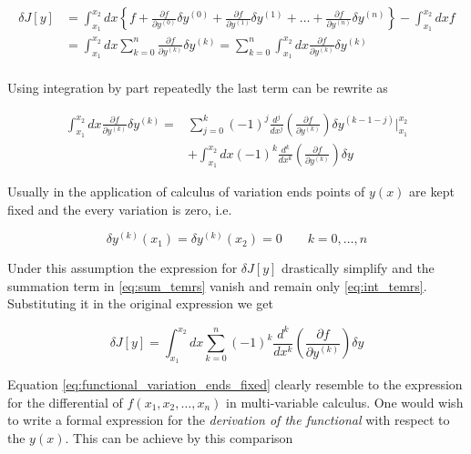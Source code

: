 \begin{align*}
  \delta J[y]
  &=\int_{x_1}^{x_2} dx \left\{ f +
    \frac{\partial f}{\partial y^{(0)}} \delta y^{(0)} +
    \frac{\partial f}{\partial y^{(1)}} \delta y^{(1)} + \ldots +
    \frac{\partial f}{\partial y^{(n)}} \delta y^{(n)}
    \right\} - \int_{x_1}^{x_2} dx f \\
  &=\int_{x_1}^{x_2} dx
    \sum_{k = 0}^{n} \frac{\partial f}{\partial y^{(k)}} \delta y^{(k)}
   =\sum_{k = 0}^{n}
    \int_{x_1}^{x_2} dx \frac{\partial f}{\partial y^{(k)}} \delta y^{(k)} \\
\end{align*}

Using integration by part repeatedly the last term can be rewrite as

\begin{align}
  \label{eq:sum_temrs}
  \int_{x_1}^{x_2} dx \frac{\partial f}{\partial y^{(k)}} \delta y^{(k)} =
  & \sum_{j=0}^{k} (-1)^j \frac{d^j}{dx^j}
  \left( \frac{\partial f}{\partial y^{(k)}} \right) \delta y^{(k-1-j)}
  \Big|_{x_1}^{x_2} \\
  \label{eq:int_temrs}
  & + \int_{x_1}^{x_2} dx (-1)^k \frac{d^k}{dx^k}
  \left( \frac{\partial f}{\partial y^{(k)}}\right) \delta y
\end{align}

Usually in the application of calculus of variation ends points of $y(x)$ are
kept fixed and the every variation is zero, i.e.

\begin{equation} \label{eq:fixed_ends}
  \delta y^{(k)}(x_1) = \delta y^{(k)}(x_2) = 0  \qquad k = 0, \ldots, n
\end{equation}

Under this assumption the expression for $\delta J[y]$ drastically simplify and
the summation term in \eqref{eq:sum_temrs} vanish and remain only
\eqref{eq:int_temrs}. Substituting it in the original expression we get

\begin{equation} \label{eq:functional_variation_ends_fixed}
  \delta J[y] = \int_{x_1}^{x_2} dx \sum_{k = 0}^{n} (-1)^k \frac{d^k}{dx^k}
  \left( \frac{\partial f}{\partial y^{(k)}}\right) \delta y
\end{equation}

Equation \eqref{eq:functional_variation_ends_fixed} clearly resemble to the
expression for the differential of $f(x_1, x_2, \ldots, x_n)$ in multi-variable
calculus. One would wish to write a formal expression for the \emph{derivation
of the functional} with respect to the $y(x)$. This can be achieve by this
comparison

